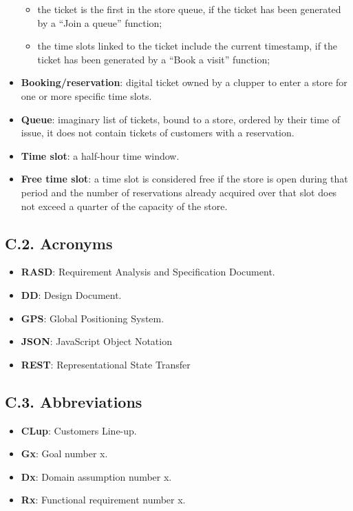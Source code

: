 \begin{itemize}
\begin{itemize}
  \tightlist
  \item
    the ticket is the first in the store queue, if the ticket has been generated by a ``Join a queue'' function;
  \item
    the time slots linked to the ticket include the current timestamp, if the ticket has been generated by a ``Book a visit'' function;
  \end{itemize}
\item
  \textbf{Booking/reservation}: digital ticket owned by a clupper to enter a store for one or more specific time slots.
\item
  \textbf{Queue}: imaginary list of tickets, bound to a store, ordered by their time of issue, it does not contain tickets of customers with a reservation.
\item
  \textbf{Time slot}: a half-hour time window.
\item
  \textbf{Free time slot}: a time slot is considered free if the store is open during that period and the number of reservations already acquired over that slot does not exceed a quarter of the capacity of the store.
\end{itemize}

\subsection{C.2. Acronyms}

\begin{itemize}
\item
  \textbf{RASD}: Requirement Analysis and Specification Document.
\item
  \textbf{DD}: Design Document.
\item
  \textbf{GPS}: Global Positioning System.
\item
  \textbf{JSON}: JavaScript Object Notation
\item
  \textbf{REST}: Representational State Transfer
\end{itemize}

\subsection{C.3. Abbreviations}

\begin{itemize}
\item
  \textbf{CLup}: Customers Line-up.
\item
  \textbf{Gx}: Goal number x.
\item
  \textbf{Dx}: Domain assumption number x.
\item
  \textbf{Rx}: Functional requirement number x.
\end{itemize}

